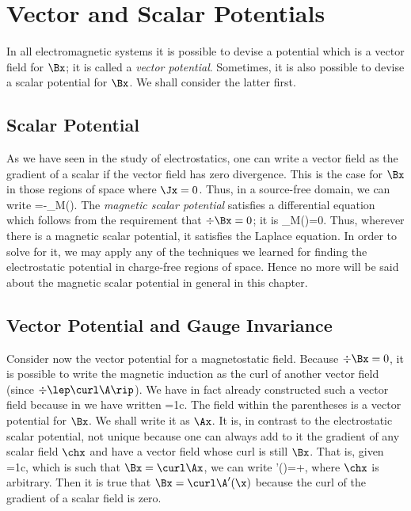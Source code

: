 {\section{Vector and Scalar Potentials}
In all electromagnetic systems it is possible to devise a potential
which is a vector field for $\Bx$; it is called a {\em vector potential}.
Sometimes, it is also possible to devise a scalar potential for $\Bx$. We
shall consider the latter first.

\subsection{Scalar Potential}
As we have seen in the study of electrostatics, one can write a vector
field as the gradient of a scalar if the vector field has zero divergence.
This is the case for $\Bx$ in those regions of space where $\Jx=0$. Thus,
in a source-free domain, we can write
\beq
\Bx=-\grad\Ph_M(\x).
\eeq
The {\em magnetic scalar potential} satisfies a differential equation which
follows from the requirement that $\div\Bx=0$; it is
\beq
\lap\Ph_M(\x)=0.
\eeq
Thus, wherever there is a magnetic scalar potential, it satisfies the
Laplace equation. In order to solve for it, we may apply any of the
techniques we learned for finding the electrostatic potential in
charge-free regions of space. Hence no more will be said about the
magnetic scalar potential in general in this chapter.

\subsection{Vector Potential and Gauge Invariance}
Consider now the vector potential for a magnetostatic field. Because
$\div\Bx=0$, it is possible to write the magnetic induction as the curl of
another vector field (since $\div\lep\curl\A\rip$).  We have in fact already 
constructed such a vector field because in  we have written
\beq
\Bx=\curl\lep\frac1c\inivp\frac{\J(\xp)}{\xxpa}\rip.
\eeq
The field within the parentheses is a vector potential for $\Bx$. We shall
write it as $\Ax$. It is, in contrast to the electrostatic scalar
potential, not unique because one can always add to it the gradient of any
scalar field $\chx$ and have a vector field whose curl is still $\Bx$.
That is, given
\beq
\Ax=\frac1c\inivp\frac\Jxp\xxpa,
\eeq
which is such that $\Bx=\curl\Ax$, we can write
\beq
\A'(\x)=\Ax+\grad\chx,
\eeq
where $\chx$ is arbitrary. Then it is true that $\Bx=\curl\A'(\x)$ because
the curl of the gradient of a scalar field is zero.

}

